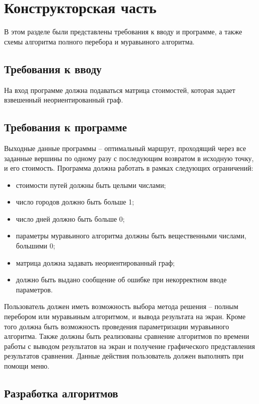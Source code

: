 \chapter{Конструкторская часть}
В этом разделе были представлены требования к вводу и программе, а также схемы алгоритма полного перебора и муравьиного алгоритма.

\section{Требования к вводу}
На вход программе должна подаваться матрица стоимостей, которая задает взвешенный неориентированный граф. 

\section{Требования к программе}
Выходные данные программы -- оптимальный маршрут, проходящий через все заданные вершины по одному разу с последующим возвратом в исходную точку, и его стоимость. Программа должна работать в рамках следующих ограничений: 

\begin{itemize}
 \item стоимости путей должны быть целыми числами;
 \item число городов должно быть больше 1;
 \item число дней должно быть больше 0;
 \item параметры муравьиного алгоритма должны быть вещественными числами, большими 0;
 \item матрица должна задавать неориентированный граф;
 \item должно быть выдано сообщение об ошибке при некорректном вводе параметров.
\end{itemize}

Пользователь должен иметь возможность выбора метода решения -- полным перебором или муравьиным алгоритмом, и вывода результата на экран. Кроме того должна быть возможность проведения параметризации муравьиного алгоритма. Также должны быть реализованы сравнение алгоритмов по времени работы с выводом результатов на экран и получение графического представления результатов сравнения. Данные действия пользователь должен выполнять при помощи меню.

\section{Разработка алгоритмов}

